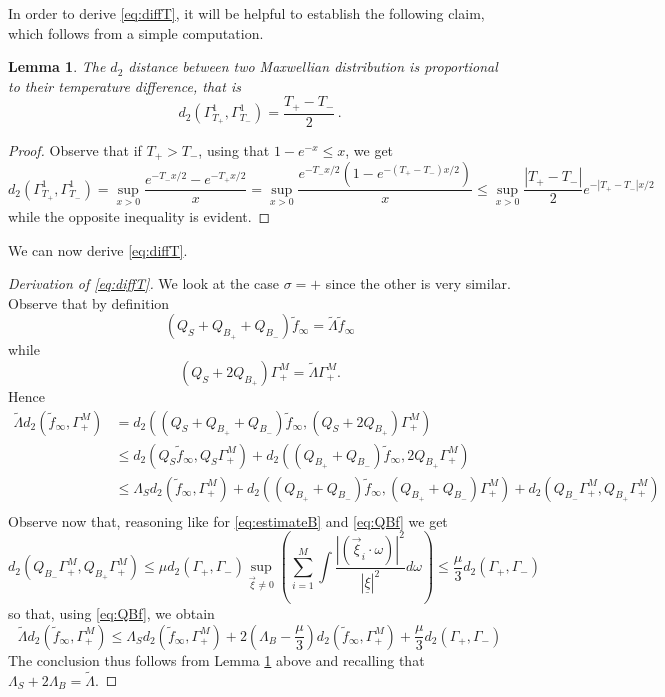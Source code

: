 \documentclass{article}
\newcommand\uxi{{\underline \xi}}
\newcommand\vxi{{\vec \xi}}
\newtheorem{mylemma}[mythm]{Lemma}
\begin{document}
In order to derive \eqref{eq:diffT}, it will be helpful to establish the following claim, which follows from a simple computation.

\begin{mylemma} \label{lem:diffT}
The $d_2$ distance between two Maxwellian distribution is proportional to their temperature difference, that is
\[
d_2(\Gamma^1_{T_+},\Gamma^1_{T_-})=\frac{T_+-T_-}2\, .
\]
\end{mylemma}

\begin{proof}
Observe that if $T_+>T_-$, using that $1-e^{-x}\leq x$, we get
\[
d_2(\Gamma^1_{T_+},\Gamma^1_{T_-})=\sup_{x>0}\frac{e^{-T_-x/2}-e^{-T_+x/2}}x=
\sup_{x>0}\frac{e^{-T_-x/2}(1-e^{-(T_+-T_-)x/2})}x\leq 
\sup_{x>0}\frac{|T_+-T_-|}2 e^{-|T_+-T_-|x/2} 
\]
while the opposite inequality is evident.
\end{proof}

We can now derive \eqref{eq:diffT}.

\begin{proof}[Derivation of \eqref{eq:diffT}]
We look at the case $\sigma=+$ since the other is very similar. Observe that by definition
	\[
	(Q_S + Q_{B_+} + Q_{B_-})\tilde f_\infty = \widetilde\Lambda \tilde f_\infty
	\]
	while
	\[
	(Q_S + 2Q_{B_+}) \Gamma_+^M = \widetilde\Lambda \Gamma_+^M.
	\]
	Hence 
	\[
	\begin{aligned}
		\widetilde \Lambda d_2(\tilde f_\infty, \Gamma_+^M) &= d_2((Q_S +
Q_{B_+} + Q_{B_-})\tilde f_\infty, (Q_S + 2Q_{B_+}) \Gamma_+^M)\\
		&\leq d_2(Q_S\tilde f_\infty, Q_S\Gamma_+^M) + d_2((Q_{B_+} + Q_{B_-})\tilde f_\infty, 2Q_{B_+} \Gamma_+^M) \\
		&\leq \Lambda_S d_2(\tilde f_\infty, \Gamma_+^M) + d_2((Q_{B_+} + Q_{B_-})\tilde f_\infty, (Q_{B_+} + Q_{B_-})\Gamma_+^M) + 
		d_2( Q_{B_-}\Gamma_+^M, Q_{B_+} \Gamma_+^M) \\
	\end{aligned}
	\]
Observe now that, reasoning like for \eqref{eq:estimateB} and \eqref{eq:QBf} we get
\[
d_2( Q_{B_-}\Gamma_+^M, Q_{B_+} \Gamma_+^M)\leq \mu d_2(\Gamma_+,\Gamma_-)\sup_{\vxi\not=0}\left(\sum_{i=1}^M\int \frac{|(\vec\xi_i\cdot\omega)|^2}{|\uxi|^2} d\omega\right)\leq \frac\mu 3 d_2(\Gamma_+,\Gamma_-)
\]
so that, using \eqref{eq:QBf}, we obtain
\[
\widetilde \Lambda d_2(\tilde f_\infty, \Gamma_+^M)\leq \Lambda_S d_2(\tilde f_\infty, \Gamma_+^M) + 2\left(\Lambda_B-\frac\mu3\right) d_2(\tilde f_\infty, \Gamma_+^M) + \frac\mu 3 d_2(\Gamma_+,\Gamma_-)
\]
	The conclusion thus follows from Lemma \ref{lem:diffT} above and recalling that $\Lambda_S + 2\Lambda_B =\widetilde\Lambda.$
\end{proof}
\end{document}
